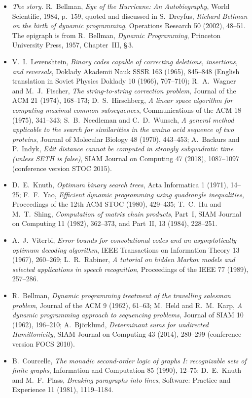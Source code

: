 \begin{itemize}
\item \emph{The story.} R.~Bellman, \emph{Eye of the Hurricane: An Autobiography}, World Scientific, 1984, p.~159, quoted and discussed in S.~Dreyfus, \emph{Richard Bellman on the birth of dynamic programming}, Operations Research 50 (2002), 48--51.
The epigraph is from R.~Bellman, \emph{Dynamic Programming}, Princeton University Press, 1957, Chapter~III, \S\,3.
\item V.~I.~Levenshtein, \emph{Binary codes capable of correcting deletions, insertions, and reversals}, Doklady Akademii Nauk SSSR 163 (1965), 845--848 (English translation in Soviet Physics Doklady 10 (1966), 707--710); R.~A.~Wagner and M.~J.~Fischer,
\emph{The string-to-string correction problem}, Journal of the ACM 21 (1974), 168--173; D.~S.~Hirschberg, \emph{A linear space algorithm for computing maximal common subsequences}, Communications of the ACM 18 (1975), 341--343; S.~B.~Needleman and C.~D.~Wunsch,
\emph{A general method applicable to the search for similarities in the amino acid sequence of two proteins}, Journal of Molecular Biology 48 (1970), 443--453; A.~Backurs and P.~Indyk, \emph{Edit distance cannot be computed in strongly subquadratic time (unless SETH is false)},
SIAM Journal on Computing 47 (2018), 1087--1097 (conference version STOC 2015).
\item D.~E.~Knuth, \emph{Optimum binary search trees}, Acta Informatica 1 (1971), 14--25; F.~F.~Yao, \emph{Efficient dynamic programming using quadrangle inequalities}, Proceedings of the 12th ACM STOC (1980), 429--435; T.~C.~Hu and M.~T.~Shing, \emph{Computation of matrix chain products},
Part~I, SIAM Journal on Computing 11 (1982), 362--373, and Part~II, 13 (1984), 228--251.
\item A.~J.~Viterbi, \emph{Error bounds for convolutional codes and an asymptotically optimum decoding algorithm}, IEEE Transactions on Information Theory 13 (1967), 260--269; L.~R.~Rabiner, \emph{A tutorial on hidden Markov models and selected applications in speech recognition},
Proceedings of the IEEE 77 (1989), 257--286.
\item R.~Bellman, \emph{Dynamic programming treatment of the travelling salesman problem}, Journal of the ACM 9 (1962), 61--63; M.~Held and R.~M.~Karp, \emph{A dynamic programming approach to sequencing problems}, Journal of SIAM 10 (1962), 196--210; A.~Bj\"orklund, \emph{Determinant sums for
undirected Hamiltonicity}, SIAM Journal on Computing 43 (2014), 280--299 (conference version FOCS 2010).
\item B.~Courcelle, \emph{The monadic second-order logic of graphs I: recognizable sets of finite graphs}, Information and Computation 85 (1990), 12--75; D.~E.~Knuth and M.~F.~Plass, \emph{Breaking paragraphs into lines}, Software: Practice and Experience 11 (1981), 1119--1184.
\end{itemize}
